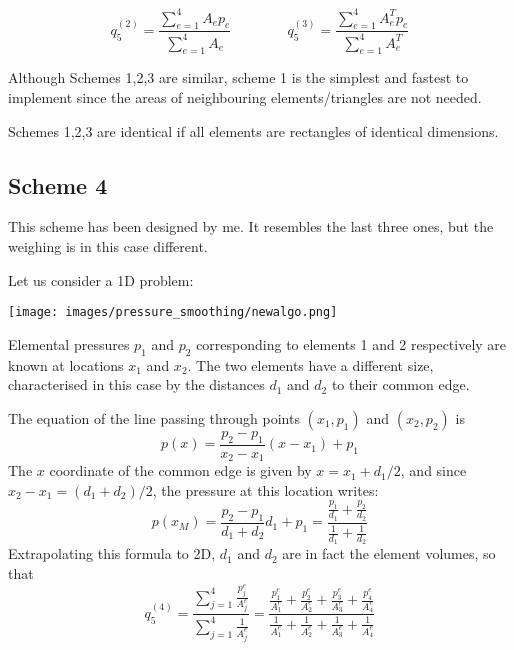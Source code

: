 \begin{multicols}{2}
\end{multicols}




\[
q_5^{(2)} = \frac{\sum\limits_{e=1}^4 A_e p_e}{\sum\limits_{e=1}^4 A_e}
\qquad
\qquad
q_5^{(3)} = \frac{\sum\limits_{e=1}^4 A_e^T p_e}{\sum\limits_{e=1}^4 A_e^T}
\] 


\begin{remark} Although Schemes 1,2,3 are similar, scheme 1 is the simplest and fastest
to implement since the areas of neighbouring elements/triangles are not needed.
\end{remark}

\begin{remark} 
Schemes 1,2,3 are identical if all elements are rectangles of identical dimensions.
\end{remark}




\subsection{Scheme 4} 

This scheme has been designed by me. 
It resembles the last three ones, but the weighing is in this case different.

Let us consider a 1D problem:
\begin{center}
\texttt{[image: images/pressure\_smoothing/newalgo.png]}
\end{center}

Elemental pressures $p_1$ and $p_2$ corresponding to elements 1 and 2 respectively are known at
locations $x_1$ and $x_2$. The two elements have a different size, characterised in this case
by the distances $d_1$ and $d_2$ to their common edge.

The equation of the line passing through points $(x_1,p_1)$ and $(x_2,p_2)$ is 
\[
p(x)=\frac{p_2-p_1}{x_2-x_1}(x-x_1)+p_1
\]
The $x$ coordinate of the common edge is given by $x=x_1+d_1/2$, 
and since $x_2-x_1=(d_1+d_2)/2$, the 
pressure at this location writes:
\[
p(x_M)= \frac{p_2-p_1}{d_1+d_2}d_1+p_1 = \frac{\frac{p_1}{d_1} + \frac{p_2}{d_2}}{\frac{1}{d_1} + \frac{1}{d_2}}
\]
Extrapolating this formula to 2D, $d_1$ and $d_2$ are in fact the element volumes, so that
\[
q_5^{(4)} = 
\frac{\sum\limits_{j=1}^4 \frac{p_j^e}{A_j^e}}{\sum\limits_{j=1}^4 \frac{1}{A_j^e}}
=
\frac{
\frac{p_1^e}{A_1^e}+
\frac{p_2^e}{A_2^e}+
\frac{p_3^e}{A_3^e}+
\frac{p_4^e}{A_4^e}
}{
\frac{1}{A_1^e}+
\frac{1}{A_2^e}+
\frac{1}{A_3^e}+
\frac{1}{A_4^e}
}\]

